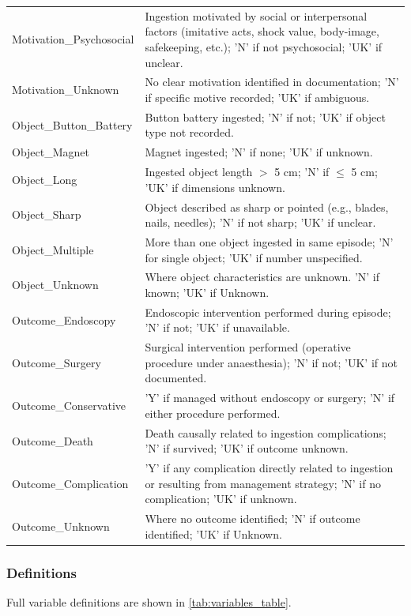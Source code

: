 \begin{appendices}
\begin{table}[h]
\begin{tabular}{p{4cm} p{11cm}}
Motivation\_Psychosocial & Ingestion motivated by social or interpersonal factors (imitative acts, shock value, body-image, safekeeping, etc.); 'N' if not psychosocial; 'UK' if unclear. \\
Motivation\_Unknown & No clear motivation identified in documentation; 'N' if specific motive recorded; 'UK' if ambiguous. \\
Object\_Button\_Battery & Button battery ingested; 'N' if not; 'UK' if object type not recorded. \\
Object\_Magnet & Magnet ingested; 'N' if none; 'UK' if unknown. \\
Object\_Long & Ingested object length $>$ 5 cm; 'N' if $\leq$ 5 cm; 'UK' if dimensions unknown. \\
Object\_Sharp & Object described as sharp or pointed (e.g., blades, nails, needles); 'N' if not sharp; 'UK' if unclear. \\
Object\_Multiple & More than one object ingested in same episode; 'N' for single object; 'UK' if number unspecified. \\
Object\_Unknown & Where object characteristics are unknown. 'N' if known; 'UK' if Unknown. \\
Outcome\_Endoscopy & Endoscopic intervention performed during episode; 'N' if not; 'UK' if unavailable. \\
Outcome\_Surgery & Surgical intervention performed (operative procedure under anaesthesia); 'N' if not; 'UK' if not documented. \\
Outcome\_Conservative & 'Y' if managed without endoscopy or surgery; 'N' if either procedure performed. \\
Outcome\_Death & Death causally related to ingestion complications; 'N' if survived; 'UK' if outcome unknown. \\
Outcome\_Complication & 'Y' if any complication directly related to ingestion or resulting from management strategy; 'N' if no complication; 'UK' if unknown. \\
Outcome\_Unknown & Where no outcome identified; 'N' if outcome identified; 'UK' if Unknown. \\
\bottomrule
\end{tabular}
\end{table}

\subsubsection{Definitions}
Full variable definitions are shown in \ref{tab:variables_table}.


\end{appendices}
